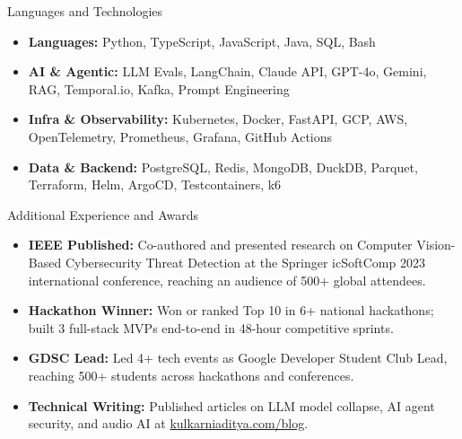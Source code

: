 \documentclass[]{mcdowellcv}
\begin{document}
\begin{cvsection}{Languages and Technologies}
  \begin{cvsubsection}{}{}{}
    \begin{itemize}
      \item \textbf{Languages:} Python, TypeScript, JavaScript, Java, SQL, Bash
      \item \textbf{AI \& Agentic:} LLM Evals, LangChain, Claude API, GPT-4o, Gemini, RAG, Temporal.io, Kafka, Prompt Engineering
      \item \textbf{Infra \& Observability:} Kubernetes, Docker, FastAPI, GCP, AWS, OpenTelemetry, Prometheus, Grafana, GitHub Actions
      \item \textbf{Data \& Backend:} PostgreSQL, Redis, MongoDB, DuckDB, Parquet, Terraform, Helm, ArgoCD, Testcontainers, k6
    \end{itemize}
  \end{cvsubsection}
\end{cvsection}

\begin{cvsection}{Additional Experience and Awards}
  \begin{cvsubsection}{}{}{}
    \begin{itemize}
      \item \textbf{IEEE Published:} Co-authored and presented research on Computer Vision-Based Cybersecurity Threat Detection at the Springer icSoftComp 2023 international conference, reaching an audience of 500+ global attendees.
      \item \textbf{Hackathon Winner:} Won or ranked Top 10 in 6+ national hackathons; built 3 full-stack MVPs end-to-end in 48-hour competitive sprints.
      \item \textbf{GDSC Lead:} Led 4+ tech events as Google Developer Student Club Lead, reaching 500+ students across hackathons and conferences.
      \item \textbf{Technical Writing:} Published articles on LLM model collapse, AI agent security, and audio AI at \href{https://www.kulkarniaditya.com/blog}{kulkarniaditya.com/blog}.
    \end{itemize}
  \end{cvsubsection}
\end{cvsection}
\end{document}
